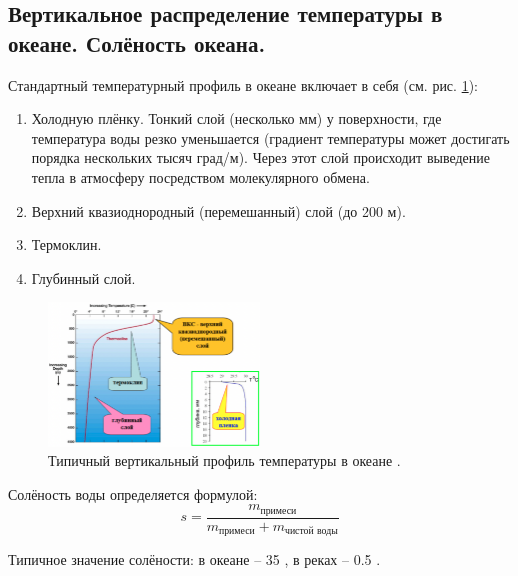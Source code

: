 \subsection{Вертикальное распределение температуры в океане. Солёность океана.}
Стандартный температурный профиль в океане включает в себя (см. рис. \ref{fig:T(h)}):
\begin{enumerate}
\item Холодную плёнку. Тонкий слой (несколько мм) у поверхности, где температура воды резко уменьшается (градиент температуры может достигать порядка нескольких тысяч град/м). Через этот слой происходит выведение тепла в атмосферу посредством молекулярного обмена.
\item Верхний квазиоднородный (перемешанный) слой (до 200 м).
\item Термоклин.
\item Глубинный слой.
\end{enumerate}

\begin{figure}[!ht]
\centering
\includegraphics[width=0.5\textwidth]{images/T(h).png}
\caption{Типичный вертикальный профиль температуры в океане \cite{Nosov2019-3}.}\label{fig:T(h)}
\end{figure}

Солёность воды определяется формулой:
\begin{equation}
s=\frac{m_\text{примеси}}{m_\text{примеси}+m_\text{чистой воды}}
\end{equation}

Типичное значение солёности: в океане -- 35 \textperthousand, в реках -- 0.5 \textperthousand.
